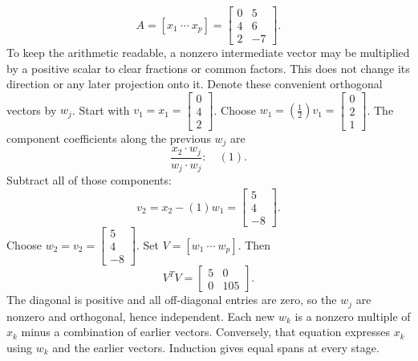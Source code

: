 \[A=[x_1\ \cdots\ x_p]=\left[\begin{array}{rr}0&5\\4&6\\2&-7\end{array}\right].\]
To keep the arithmetic readable, a nonzero intermediate vector may be multiplied by a positive scalar to clear fractions or common factors. This does not change its direction or any later projection onto it. Denote these convenient orthogonal vectors by $w_j$.
Start with $v_1=x_1=\left[\begin{array}{r}0\\4\\2\end{array}\right]$.
Choose $w_{1}=(\frac{1}{2})v_{1}=\left[\begin{array}{r}0\\2\\1\end{array}\right]$.
The component coefficients along the previous $w_j$ are
\[\frac{x_{2}\cdot w_j}{w_j\cdot w_j}:\quad(1).\]
Subtract all of those components:
\[v_{2}=x_{2}-(1)w_{1}=\left[\begin{array}{r}5\\4\\-8\end{array}\right].\]
Choose $w_{2}=v_{2}=\left[\begin{array}{r}5\\4\\-8\end{array}\right]$.
Set $V=[w_1\ \cdots\ w_p]$. Then
\[V^TV=\left[\begin{array}{rr}5&0\\0&105\end{array}\right].\]
The diagonal is positive and all off-diagonal entries are zero, so the $w_j$ are nonzero and orthogonal, hence independent. Each new $w_k$ is a nonzero multiple of $x_k$ minus a combination of earlier vectors. Conversely, that equation expresses $x_k$ using $w_k$ and the earlier vectors. Induction gives equal spans at every stage.

